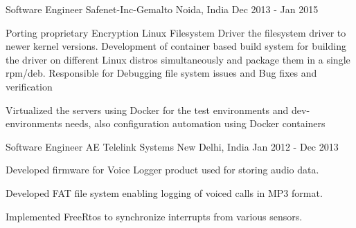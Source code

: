 \begin{cventries}
  \cventry
    {Software Engineer}
    {Safenet-Inc-Gemalto}
    {Noida, India}
    {Dec 2013 - Jan 2015}
    {
      \begin{cvitems}
        \item {Porting proprietary Encryption Linux Filesystem Driver the filesystem driver to newer kernel versions. Development of container based build system for building the driver on different Linux distros simultaneously and package them in a single rpm/deb. Responsible for Debugging file system issues and Bug fixes and verification}
        \item {Virtualized the servers using Docker for the test environments and dev-environments needs, also configuration automation using Docker containers}
      \end{cvitems}
    }	  
	  
  \cventry
    {Software Engineer}
    {AE Telelink Systems}
    {New Delhi, India}
    {Jan 2012 - Dec 2013}
    {
      \begin{cvitems}
        \item {Developed firmware for Voice Logger product used for storing audio data. }
        \item {Developed FAT file system enabling logging of voiced calls in MP3 format.}
        \item {Implemented FreeRtos to synchronize interrupts from various sensors.}
      \end{cvitems}
    }  
\end{cventries}
